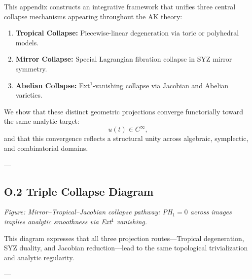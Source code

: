 \documentclass[11pt]{article}
\begin{document}
\begin{axiom}
\begin{axiom}
{{This appendix constructs an integrative framework that unifies three central collapse mechanisms  
appearing throughout the AK theory:

\begin{enumerate}
  \item \textbf{Tropical Collapse:} Piecewise-linear degeneration via toric or polyhedral models.
  \item \textbf{Mirror Collapse:} Special Lagrangian fibration collapse in SYZ mirror symmetry.
  \item \textbf{Abelian Collapse:} Ext$^1$-vanishing collapse via Jacobian and Abelian varieties.
\end{enumerate}

We show that these distinct geometric projections converge functorially toward the same analytic target:
\[
u(t) \in C^\infty,
\]
and that this convergence reflects a structural unity across algebraic, symplectic, and combinatorial domains.

---

\subsection*{O.2 Triple Collapse Diagram}

\noindent
\begin{minipage}{\textwidth}
\centering
{}
\vspace{0.5em}

\small\textit{Figure: Mirror–Tropical–Jacobian collapse pathway: PH$_1 = 0$ across images implies analytic smoothness via Ext$^1$ vanishing.}
\end{minipage}

This diagram expresses that all three projection routes—Tropical degeneration, SYZ duality, and Jacobian reduction—lead to the same topological trivialization and analytic regularity.

---

}}
\end{axiom}
\end{axiom}
\end{document}
